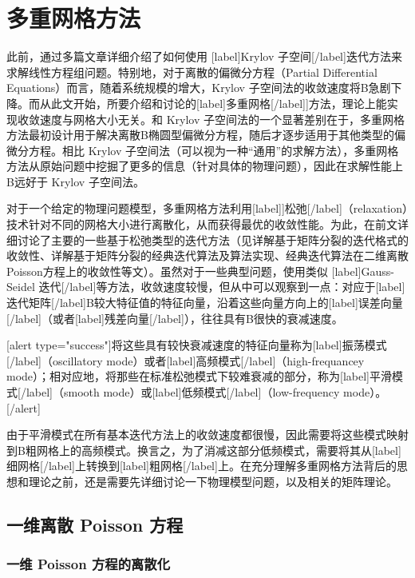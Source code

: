 \documentclass[12pt, UTF8, nofonts]{ctexart}
\begin{document}

\section*{多重网格方法}

此前，通过多篇文章详细介绍了如何使用 [label]Krylov 子空间[/label]迭代方法来求解线性方程组问题。特别地，对于离散的偏微分方程（Partial Differential Equations）而言，随着系统规模的增大，Krylov 子空间法的收敛速度将B急剧下降。而从此文开始，所要介绍和讨论的[label]多重网格[/label]]方法，理论上能实现收敛速度与网格大小无关。和 Krylov 子空间法的一个显著差别在于，多重网格方法最初设计用于解决离散B椭圆型偏微分方程，随后才逐步适用于其他类型的偏微分方程。相比 Krylov 子空间法（可以视为一种“通用”的求解方法），多重网格方法从原始问题中挖掘了更多的信息（针对具体的物理问题），因此在求解性能上B远好于 Krylov 子空间法。

对于一个给定的物理问题模型，多重网格方法利用[label]]松弛[/label]（relaxation）技术针对不同的网格大小进行离散化，从而获得最优的收敛性能。为此，在前文详细讨论了主要的一些基于松弛类型的迭代方法（见详解基于矩阵分裂的迭代格式的收敛性、详解基于矩阵分裂的经典迭代算法及算法实现、经典迭代算法在二维离散Poisson方程上的收敛性等文）。虽然对于一些典型问题，使用类似 [label]Gauss-Seidel 迭代[/label]等方法，收敛速度较慢，但从中可以观察到一点：对应于[label]迭代矩阵[/label]B较大特征值的特征向量，沿着这些向量方向上的[label]误差向量[/label]（或者[label]残差向量[/label]），往往具有B很快的衰减速度。

[alert type="success"]将这些具有较快衰减速度的特征向量称为[label]振荡模式[/label]（oscillatory mode）或者[label]高频模式[/label]（high-frequancey mode）；相对应地，将那些在标准松弛模式下较难衰减的部分，称为[label]平滑模式[/label]（smooth mode）或[label]低频模式[/label]（low-frequency mode）。[/alert]

由于平滑模式在所有基本迭代方法上的收敛速度都很慢，因此需要将这些模式映射到B粗网格上的高频模式。换言之，为了消减这部分低频模式，需要将其从[label]细网格[/label]上转换到[label]粗网格[/label]上。在充分理解多重网格方法背后的思想和理论之前，还是需要先详细讨论一下物理模型问题，以及相关的矩阵理论。



\subsection*{一维离散 Poisson 方程}

\subsubsection*{一维 Poisson 方程的离散化}
\end{document}
